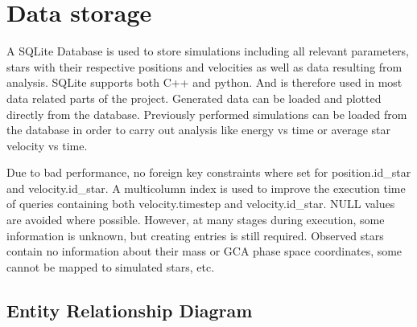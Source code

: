\documentclass[letterpaper,10pt,english]{sphinxmanual}
\begin{document}
	\chapter{Data storage}
		\label{\detokenize{NBodySimulation/Database:database}}\label{\detokenize{NBodySimulation/Database::doc}}
		\sphinxAtStartPar
		A SQLite Database is used to store simulations including all relevant parameters, stars with their respective positions and velocities as well as data resulting from analysis.
		SQLite supports both C++ and python. And is therefore used in most data related parts of the project. Generated data can be loaded and plotted directly from the database.
		Previously performed simulations can be loaded from the database in order to carry out analysis like energy vs time or average star velocity vs time.
		
		\sphinxAtStartPar
		Due to bad performance, no foreign key constraints where set for position.id\_star and velocity.id\_star.
		A multi\sphinxhyphen{}column index is used to improve the execution time of queries containing both velocity.timestep and velocity.id\_star.
		NULL values are avoided where possible. However, at many stages during execution, some information is unknown, but creating entries is still required.
		Observed stars contain no information about their mass or GCA phase space coordinates, some cannot be mapped to simulated stars, etc.
		
		
		\section{Entity Relationship Diagram}
		\label{\detokenize{NBodySimulation/Database:entity-relationship-diagram}}
		\noindent{}

	\renewcommand{\abstractname}{Summary}
	\begin{abstract}
	\end{abstract}
\end{document}
